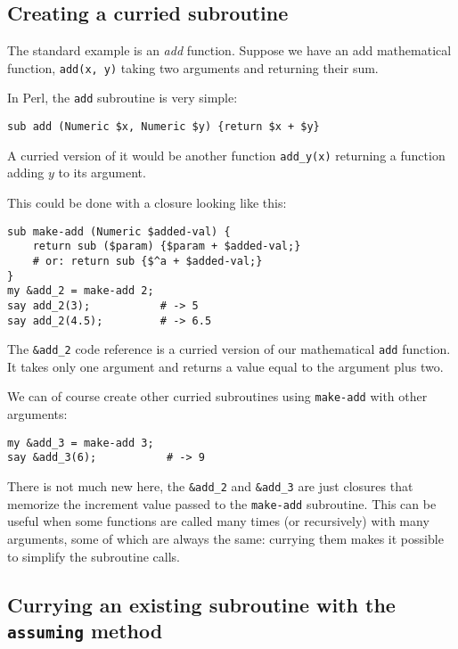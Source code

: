 \subsection{Creating a curried subroutine}

The standard example is an \emph{add} function. Suppose 
we have an add mathematical function, \verb'add(x, y)' 
taking two arguments and returning their sum. 

In Perl, the {\tt add} subroutine is very simple:

\begin{verbatim}
sub add (Numeric $x, Numeric $y) {return $x + $y}
\end{verbatim}

A curried version of it would be another function 
\verb'add_y(x)' returning a function adding $y$ to 
its argument.

This could be done with a closure looking like this:

\begin{verbatim}
sub make-add (Numeric $added-val) {
    return sub ($param) {$param + $added-val;}    
    # or: return sub {$^a + $added-val;}
}
my &add_2 = make-add 2;
say add_2(3);           # -> 5
say add_2(4.5);         # -> 6.5
\end{verbatim}

The \verb'&add_2' code reference is a curried version 
of our mathematical {\tt add} function. It takes only 
one argument and returns a value equal to the argument 
plus two.

We can of course create other curried subroutines using 
{\tt make-add} with other arguments:

\begin{verbatim}
my &add_3 = make-add 3;
say &add_3(6);           # -> 9
\end{verbatim}

There is not much new here, the \verb'&add_2' and 
\verb'&add_3' are just closures that memorize the 
increment value passed to the {\tt make-add} 
subroutine. This can be useful when some functions 
are called many times (or recursively) with many  
arguments, some of which are always the same: 
currying them makes it possible to simplify the 
subroutine calls.

\subsection{Currying an existing subroutine with the {\tt assuming} method}

